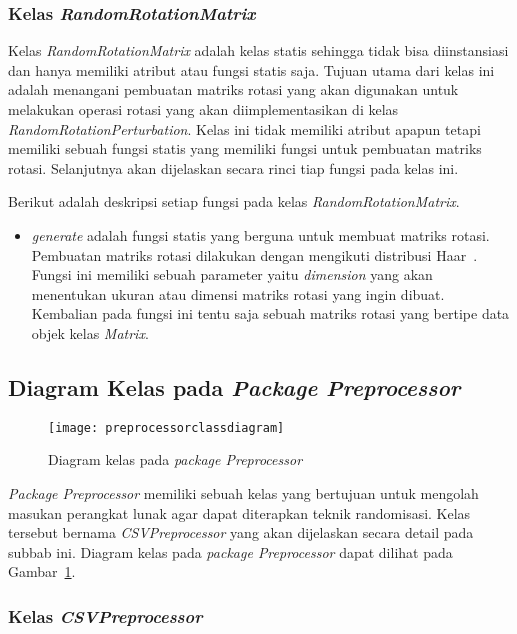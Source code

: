 \subsubsection{Kelas \textit{RandomRotationMatrix}}
\label{subsubsec:kelas-rrm}

Kelas \textit{RandomRotationMatrix} adalah kelas statis sehingga tidak bisa diinstansiasi dan hanya memiliki atribut atau fungsi statis saja. Tujuan utama dari kelas ini adalah menangani pembuatan matriks rotasi yang akan digunakan untuk melakukan operasi rotasi yang akan diimplementasikan di kelas \textit{RandomRotationPerturbation}. Kelas ini tidak memiliki atribut apapun tetapi memiliki sebuah fungsi statis yang memiliki fungsi untuk pembuatan matriks rotasi. Selanjutnya akan dijelaskan secara rinci tiap fungsi pada kelas ini.

Berikut adalah deskripsi setiap fungsi pada kelas \textit{RandomRotationMatrix}.
\begin{itemize}
	\item \textit{generate} adalah fungsi statis yang berguna untuk membuat matriks rotasi. Pembuatan matriks rotasi dilakukan dengan mengikuti distribusi Haar~\cite{stewart:80:orthogonal}. Fungsi ini memiliki sebuah parameter yaitu \textit{dimension} yang akan menentukan ukuran atau dimensi matriks rotasi yang ingin dibuat. Kembalian pada fungsi ini tentu saja sebuah matriks rotasi yang bertipe data objek kelas \textit{Matrix}.
\end{itemize}

\subsection{Diagram Kelas pada \textit{Package Preprocessor}}
\label{sec:diagram-kelas-preprocessor}

\begin{figure}
	\centering
	\texttt{[image: preprocessorclassdiagram]}
	\caption{Diagram kelas pada \textit{package Preprocessor}}
	\label{fig:preprocessorclassdiagram}
\end{figure}

\textit{Package Preprocessor} memiliki sebuah kelas yang bertujuan untuk mengolah masukan perangkat lunak agar dapat diterapkan teknik randomisasi. Kelas tersebut bernama \textit{CSVPreprocessor} yang akan dijelaskan secara detail pada subbab ini. Diagram kelas pada \textit{package Preprocessor} dapat dilihat pada Gambar~\ref{fig:preprocessorclassdiagram}.

\subsubsection{Kelas \textit{CSVPreprocessor}}
\label{subsubsec:kelas-csvpreprocessor}


